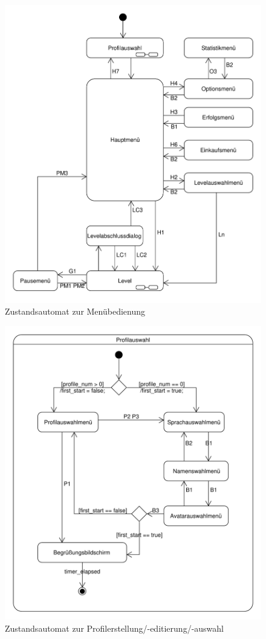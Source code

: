 \begin{figure}[H]
\centering
\includegraphics[scale=0.65]{../system_models/dynamic_models/menu_state_machine.pdf}
\caption{Zustandsautomat zur Menübedienung}
\end{figure}

\begin{figure}[H]
\centering
\includegraphics[scale=0.6]{../system_models/dynamic_models/profile_selection_state_machine.pdf}
\caption{Zustandsautomat zur Profilerstellung/-editierung/-auswahl}
\end{figure}

